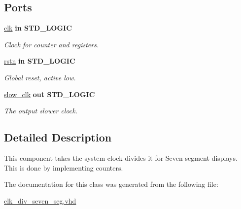 \subsection*{Ports}
 \begin{DoxyCompactItemize}
\item 
\hypertarget{classclk__div__seven__seg_a8120037e0ee47c35ba2d79242209c72e}{\hyperlink{classclk__div__seven__seg_a8120037e0ee47c35ba2d79242209c72e}{clk}  {\bfseries {\bfseries \textcolor{vhdlkeyword}{in}\textcolor{vhdlchar}{ }}} {\bfseries \textcolor{comment}{S\-T\-D\-\_\-\-L\-O\-G\-I\-C}\textcolor{vhdlchar}{ }} }\label{classclk__div__seven__seg_a8120037e0ee47c35ba2d79242209c72e}

\begin{DoxyCompactList}\small\item\em Clock for counter and registers. \end{DoxyCompactList}\item 
\hypertarget{classclk__div__seven__seg_aba021aec4b477b89079bb58ccadcc67e}{\hyperlink{classclk__div__seven__seg_aba021aec4b477b89079bb58ccadcc67e}{rstn}  {\bfseries {\bfseries \textcolor{vhdlkeyword}{in}\textcolor{vhdlchar}{ }}} {\bfseries \textcolor{comment}{S\-T\-D\-\_\-\-L\-O\-G\-I\-C}\textcolor{vhdlchar}{ }} }\label{classclk__div__seven__seg_aba021aec4b477b89079bb58ccadcc67e}

\begin{DoxyCompactList}\small\item\em Global reset, active low. \end{DoxyCompactList}\item 
\hypertarget{classclk__div__seven__seg_a222a9878f2d09833d2a12c83c451bbd4}{\hyperlink{classclk__div__seven__seg_a222a9878f2d09833d2a12c83c451bbd4}{slow\-\_\-clk}  {\bfseries {\bfseries \textcolor{vhdlkeyword}{out}\textcolor{vhdlchar}{ }}} {\bfseries \textcolor{comment}{S\-T\-D\-\_\-\-L\-O\-G\-I\-C}\textcolor{vhdlchar}{ }} }\label{classclk__div__seven__seg_a222a9878f2d09833d2a12c83c451bbd4}

\begin{DoxyCompactList}\small\item\em The output slower clock. \end{DoxyCompactList}\end{DoxyCompactItemize}


\subsection{Detailed Description}
This component takes the system clock divides it for Seven segment displays. This is done by implementing counters. 

The documentation for this class was generated from the following file\-:\begin{DoxyCompactItemize}
\item 
\hyperlink{clk__div__seven__seg_8vhd}{clk\-\_\-div\-\_\-seven\-\_\-seg.\-vhd}\end{DoxyCompactItemize}
